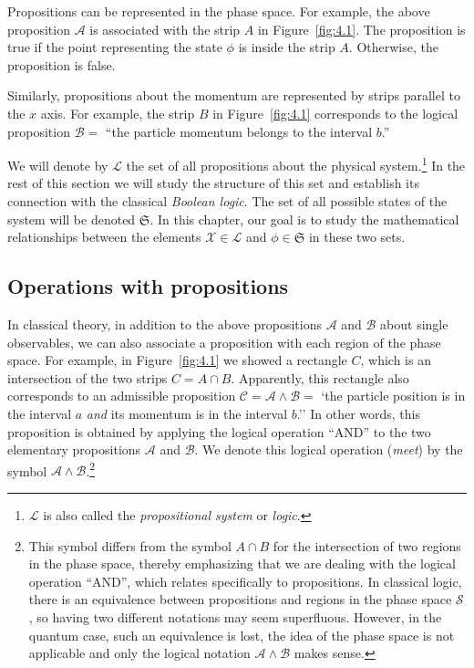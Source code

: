 \documentclass[nochecklpage]{stefan1}
\theoremstyle{definition}
\begin{document}
Propositions can be represented in the phase space. For example, the
above proposition $ \mathcal{A} $ is associated with the strip $ A $ in
Figure~\ref{fig:4.1}. The proposition is true if the point representing
the state $ \phi $ is inside the strip $ A $. Otherwise, the proposition
is false.%

Similarly, propositions about the momentum are represented by strips
parallel to the $x$ axis. For example, the strip $ B $ in Figure~\ref{fig:4.1} corresponds to the logical proposition $ \mathcal{B} = $
``the particle momentum belongs to the interval $ b $.''

We will denote by $\mathcal{L}$ the
\label{lb:set_of_allp}
set of all propositions about the physical system.\footnote{$
\mathcal{L} $ is also called the \emph{propositional system}
or \emph{logic}.} In the rest of this section we will study the
structure of this set and establish its connection with the classical
\emph{Boolean logic}. The set of all possible states
of the system will be denoted $\mathfrak{S}$.
\label{lb:set_of_alls}
In this chapter, our goal is to study the mathematical relationships
between the elements $ \mathcal{X} \in \mathcal{L} $ and $ \phi
\in \mathfrak{S} $ in these two sets.

\subsection{Operations with propositions}\label{sc:1.2.2}
In classical theory, in addition to the above propositions $
\mathcal{A} $ and $\mathcal{B} $ about single observables, we can also
associate a proposition with each region of the phase space. For
example, in Figure~\ref{fig:4.1} we showed a rectangle $C$, which is an
intersection of the two strips $ C = A \cap B $. Apparently, this
rectangle also corresponds to an admissible proposition $ \mathcal{C} = \mathcal{A}
\wedge \mathcal{B} = $ `the particle position is in the interval $a$
\emph{and} its momentum is in the interval $b$.''
\label{lb:wedge}
In other words, this proposition is obtained by applying the logical
operation ``AND'' to the two elementary propositions $ \mathcal{A}$ and
$ \mathcal{B}$. We denote this logical operation (\emph{meet}) by the symbol
\label{lb:vee}
$\mathcal{A} \wedge \mathcal{B} $.\footnote{This symbol differs from
the symbol $ A \cap B $ for the intersection of two regions in the phase
space, thereby emphasizing that we are dealing with the logical
operation ``AND'', which relates specifically to propositions. In
classical logic, there is an equivalence between propositions and
regions in the phase space $ \mathcal{S} $, so having two different
notations may seem superfluous. However, in the quantum case, such an
equivalence is lost, the idea of the phase space is not applicable and
only the logical notation $\mathcal{A} \wedge \mathcal{B} $ makes sense.}
\end{document}
